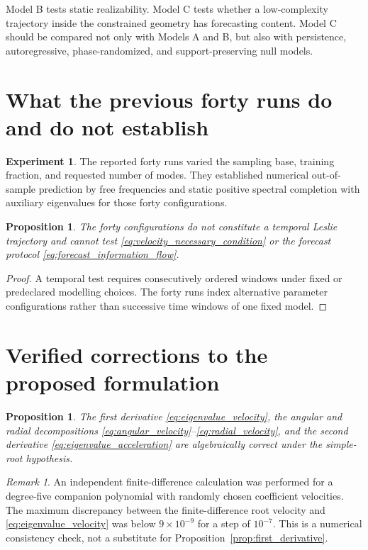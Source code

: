 \documentclass[11pt]{amsart}
\numberwithin{equation}{section}
\theoremstyle{plain}
\newtheorem{proposition}[theorem]{Proposition}
\theoremstyle{definition}
\newtheorem{experiment}[theorem]{Experiment}
\theoremstyle{remark}
\newtheorem{remark}[theorem]{Remark}
\begin{document}
Model B tests static realizability.  Model C tests whether a low-complexity trajectory inside the constrained geometry has forecasting content.  Model C should be compared not only with Models A and B, but also with persistence, autoregressive, phase-randomized, and support-preserving null models.

\section{What the previous forty runs do and do not establish}
\label{sec:forty_runs}

\begin{experiment}
\label{exp:previous_runs}
The reported forty runs varied the sampling base, training fraction, and requested number of modes.  They established numerical out-of-sample prediction by free frequencies and static positive spectral completion with auxiliary eigenvalues for those forty configurations.
\end{experiment}

\begin{proposition}
\label{prop:runs_not_trajectory}
The forty configurations do not constitute a temporal Leslie trajectory and cannot test \eqref{eq:velocity_necessary_condition} or the forecast protocol \eqref{eq:forecast_information_flow}.
\end{proposition}

\begin{proof}
A temporal test requires consecutively ordered windows under fixed or predeclared modelling choices.  The forty runs index alternative parameter configurations rather than successive time windows of one fixed model.
\end{proof}

\section{Verified corrections to the proposed formulation}
\label{sec:verified_corrections}

\begin{proposition}
\label{prop:verified_formulae}
The first derivative \eqref{eq:eigenvalue_velocity}, the angular and radial decompositions \eqref{eq:angular_velocity}--\eqref{eq:radial_velocity}, and the second derivative \eqref{eq:eigenvalue_acceleration} are algebraically correct under the simple-root hypothesis.
\end{proposition}

\begin{remark}
\label{rem:numerical_check}
An independent finite-difference calculation was performed for a degree-five companion polynomial with randomly chosen coefficient velocities.  The maximum discrepancy between the finite-difference root velocity and \eqref{eq:eigenvalue_velocity} was below $9\times10^{-9}$ for a step of $10^{-7}$.  This is a numerical consistency check, not a substitute for Proposition~\ref{prop:first_derivative}.
\end{remark}
\end{document}
